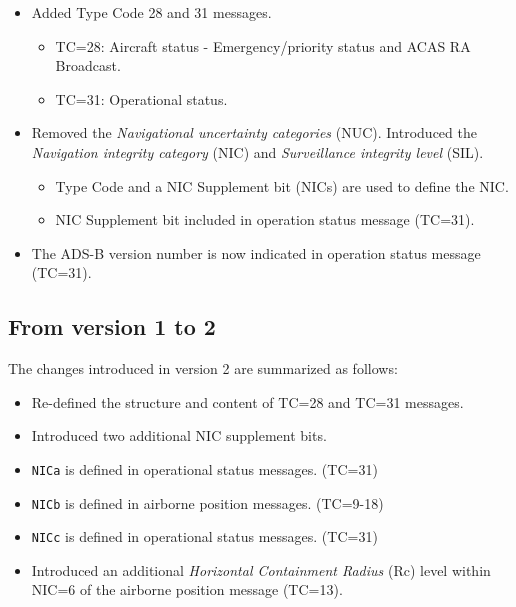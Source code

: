 \begin{itemize}
  \item Added Type Code 28 and 31 messages.

  \begin{itemize}
    \item TC=28: Aircraft status - Emergency/priority status and ACAS RA Broadcast.
    \item TC=31: Operational status.
  \end{itemize}

  \item Removed the \emph{Navigational uncertainty categories} (NUC). Introduced the \emph{Navigation integrity category} (NIC) and \emph{Surveillance integrity level} (SIL).

  \begin{itemize}
    \item Type Code and a NIC Supplement bit (NICs) are used to define the NIC.
    \item NIC Supplement bit included in operation status message (TC=31).
  \end{itemize}

  \item The ADS-B version number is now indicated in operation status message (TC=31).
\end{itemize}

\subsection{From version 1 to 2}

The changes introduced in version 2 are summarized as follows:

\begin{itemize}
\item
  Re-defined the structure and content of TC=28 and TC=31 messages.
\item
  Introduced two additional NIC supplement bits.
\item
  \texttt{NICa} is defined in operational status messages.
  (TC=31)
\item
  \texttt{NICb} is defined in airborne position messages.
  (TC=9-18)
\item
  \texttt{NICc} is defined in operational status messages.
  (TC=31)
\item
  Introduced an additional \emph{Horizontal Containment Radius} (Rc) level within NIC=6 of the airborne position message (TC=13).
\end{itemize}

